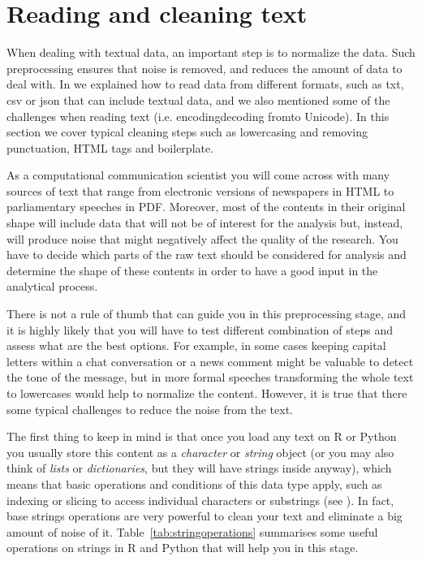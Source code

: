 \section{Reading and cleaning text}
\label{sec:readtext}

When dealing with textual data, an important step is to normalize the data. Such preprocessing ensures that noise is removed, and reduces the amount of data to deal with. In  we explained how to read data from different formats, such as txt, csv or json that can include textual data, and we also mentioned some of the challenges when reading text (i.e. encoding\/decoding from\/to Unicode). In this section we cover typical cleaning steps such as lowercasing and removing punctuation, HTML tags and boilerplate.
 
As a computational communication scientist you will come across with many sources of text that range from electronic versions of newspapers in HTML to parliamentary speeches in PDF. Moreover, most of the contents in their original shape will include data that will not be of interest for the analysis but, instead,  will produce noise that might negatively affect the quality of the research. You have to decide which parts of the raw text should be considered for analysis and determine the shape of these contents in order to have a good input in the analytical process. 

There is not a rule of thumb that can guide you in this preprocessing stage, and it is highly likely that you will have to test different combination of steps and assess what are the best options. For example, in some cases keeping capital letters within a chat conversation or a news comment might be valuable to detect the tone of the message, but in more formal speeches transforming the whole text to lowercases would help to normalize the content. However, it is true that there some typical challenges to reduce the noise from the text.

The first thing to keep in mind is that once you load any text on R or Python you usually store this content as a \emph{character} or \emph{string} object (or you may also think of \emph{lists} or \emph{dictionaries}, but they will have strings inside anyway), which means that basic operations and conditions of this data type apply, such as indexing or slicing to access individual characters or substrings (see ). In fact, base strings operations are very powerful to clean your text and eliminate a big amount of noise of it.  Table~\ref{tab:stringoperations} summarises some useful operations on strings in R and Python that will help you in this stage.   

